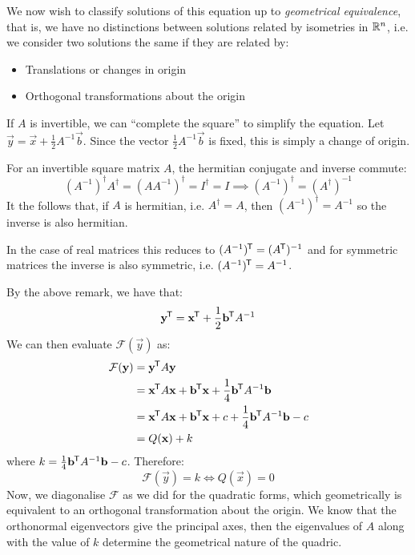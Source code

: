 \documentclass[../main.tex]{subfiles}
\begin{document}
We now wish to classify solutions of this equation up to \textit{geometrical equivalence}, that is, we have no distinctions between solutions related by isometries in $\mathbb{R}^{n}$, i.e. we consider two solutions the same if they are related by:
\begin{itemize}
  \item Translations or changes in origin
  \item Orthogonal transformations about the origin
\end{itemize}
If $A$ is invertible, we can ``complete the square'' to simplify the equation.
Let $\vec{y} = \vec{x} + \frac{1}{2}A^{-1}\vec{b}$.
Since the vector $\frac{1}{2}A^{-1} \vec{b}$ is fixed, this is simply a change of origin.
\begin{remark}
  For an invertible square matrix $A$, the hermitian conjugate and inverse commute:
  \[
    (A^{-1})^{\dag} A^{\dag} = (A A^{-1})^{\dag} = I^{\dag} = I \implies (A^{-1})^{\dag} = (A^{\dag})^{-1}
  \]
  It the follows that, if $A$ is hermitian, i.e. $A^{\dag} = A$, then $(A^{-1})^{\dag} = A^{-1}$ so the inverse is also hermitian.

  In the case of real matrices this reduces to $(A^{-1})^{{\mkern-1.5mu\mathsf{T}}} = (A^{{\mkern-1.5mu\mathsf{T}}})^{-1}$ and for symmetric matrices the inverse is also symmetric, i.e. $(A^{-1})^{{\mkern-1.5mu\mathsf{T}}} = A^{-1}$.
\end{remark}
By the above remark, we have that:
\[
  \mathbf{\bm{y}}^{{\mkern-1.5mu\mathsf{T}}} = \mathbf{\bm{x}}^{{\mkern-1.5mu\mathsf{T}}} + \frac{1}{2}\mathbf{\bm{b}}^{{\mkern-1.5mu\mathsf{T}}}A^{-1}
\]
We can then evaluate $\mathcal{F}(\vec{y})$ as:
\begin{align*}
  \mathcal{F}(\mathbf{\bm{y}}) &= \mathbf{\bm{y}}^{{\mkern-1.5mu\mathsf{T}}}A\mathbf{\bm{y}} \\
                       &= \mathbf{\bm{x}}^{{\mkern-1.5mu\mathsf{T}}}A\mathbf{\bm{x}} + \mathbf{\bm{b}}^{{\mkern-1.5mu\mathsf{T}}} \mathbf{\bm{x}} + \frac{1}{4}\mathbf{\bm{b}}^{{\mkern-1.5mu\mathsf{T}}}A^{-1}\mathbf{\bm{b}} \\
                       &= \mathbf{\bm{x}}^{{\mkern-1.5mu\mathsf{T}}}A\mathbf{\bm{x}} + \mathbf{\bm{b}}^{{\mkern-1.5mu\mathsf{T}}} \mathbf{\bm{x}} + c +  \frac{1}{4}\mathbf{\bm{b}}^{{\mkern-1.5mu\mathsf{T}}}A^{-1}\mathbf{\bm{b}} - c \\
                       &= Q(\mathbf{\bm{x}}) + k
\end{align*}
where $k = \frac{1}{4}\mathbf{\bm{b}}^{{\mkern-1.5mu\mathsf{T}}} A^{-1} \mathbf{\bm{b}} - c$.
Therefore:
\[
  \mathcal{F}(\vec{y}) = k \iff Q(\vec{x}) = 0
\]
Now, we diagonalise $\mathcal{F}$ as we did for the quadratic forms, which geometrically is equivalent to an orthogonal transformation about the origin.
We know that the orthonormal eigenvectors give the principal axes, then the eigenvalues of $A$ along with the value of $k$ determine the geometrical nature of the quadric.
\end{document}
